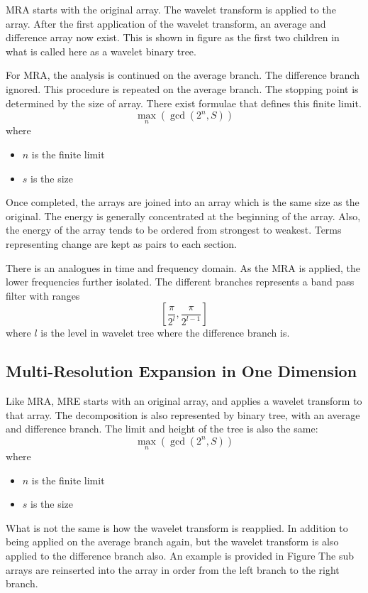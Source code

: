 MRA starts with the original array.  The wavelet transform is applied to the array.   After the first application of the wavelet transform, an average and difference array now exist.  This is shown in figure %
as the first two children in what is called here as a wavelet binary tree.

For MRA, the analysis is continued on the average branch.  The difference branch ignored.  This procedure is repeated on the average branch.   The stopping point is determined by the size of array.  There exist formulae that defines this finite limit.  
\[\max_n(\gcd(2^n,S)) \]  
where 
\begin{itemize}
\item $n$ is the finite limit
\item $s$ is the size

\end{itemize}

Once completed, the arrays are joined into an array which is the same size as the original.  The energy is generally concentrated at the beginning of the array.  Also, the energy of the array tends to be ordered from strongest to weakest.  Terms representing change are kept as pairs to each section.  

There is an analogues in time and frequency domain.  As the MRA is applied, the lower frequencies further isolated.  The different branches represents a band pass filter with ranges 
\[ [\frac{\pi}{2^l} , \frac{\pi}{2^{l-1}} ] \]
where $l$ is the level in wavelet tree where the difference branch is.  

\subsection {Multi-Resolution Expansion in One Dimension}
Like MRA, MRE starts with an original array, and applies a wavelet transform to that array.  The decomposition is also represented by binary tree, with an average and difference branch.  The limit and height of the tree is also the same:
\[\max_n(\gcd(2^n,S)) \]  
where 
\begin{itemize}
\item $n$ is the finite limit
\item $s$ is the size

\end{itemize}

What is not the same is how the wavelet transform is reapplied.  In addition to being applied on the average branch again,  but the wavelet transform is also applied to the difference branch also.   An example is provided in Figure %
The sub arrays are reinserted into the array in order from the left branch to the right branch.  

